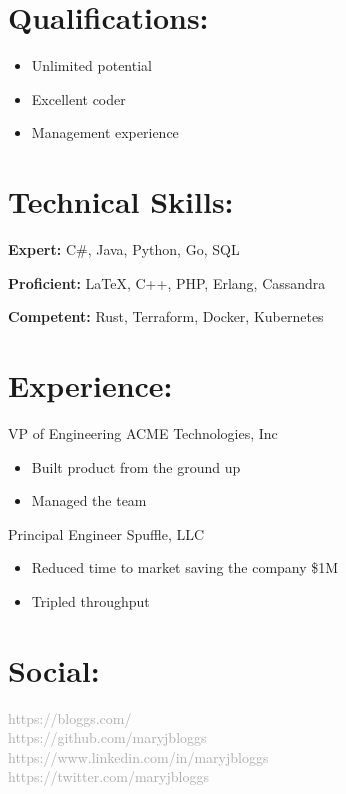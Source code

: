 \documentclass{resume}
\begin{document}

\thispagestyle{empty}
\pagestyle{empty}

\section*{Qualifications:}
\begin{itemize}
\vspace{-3em}
\setlength{\itemindent}{-2.5em}
\item Unlimited potential
\item Excellent coder
\item Management experience
\end{itemize}

\section*{Technical Skills:}

\textbf{Expert:} C\#, Java, Python, Go, SQL

\noindent\textbf{Proficient:} \LaTeX, C++, PHP, Erlang, Cassandra

\noindent\textbf{Competent:} Rust, Terraform, Docker, Kubernetes

\section*{Experience:}

    {VP of Engineering}
    {ACME Technologies, Inc}
    {}

\begin{itemize}[leftmargin=0em,topsep=0em]
  \item Built product from the ground up
  \item Managed the team
\end{itemize}

    {Principal Engineer}
    {Spuffle, LLC}
    {}

\begin{itemize}[leftmargin=0em,topsep=0em]
  \item Reduced time to market saving the company \$1M
  \item Tripled throughput
\end{itemize}

\section*{Social:}
\textcolor{darkblue}{\faHome} \textcolor{darkgray}{https://bloggs.com/}\\
\textcolor{darkblue}{\faGithub} \textcolor{darkgray}{https://github.com/maryjbloggs}\\
\textcolor{darkblue}{\faLinkedin} \textcolor{darkgray}{https://www.linkedin.com/in/maryjbloggs}\\
\textcolor{darkblue}{\faTwitter} \textcolor{darkgray}{https://twitter.com/maryjbloggs}
\end{document}
